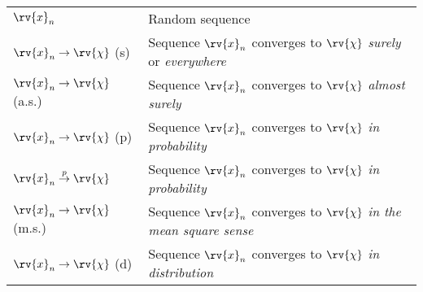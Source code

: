 \begin{table}[h]
    \centering
    \begin{tabular}{p{}p{}}
        $\rv{x}_{n}$ & Random sequence\\
        $\rv{x}_{n}\to\rv{\chi}$ \hspace{1em}(s) & Sequence $\rv{x}_{n}$ converges to $\rv{\chi}$ \emph{surely} or \emph{everywhere}\\
        $\rv{x}_{n}\to\rv{\chi}$ \hspace{1em}(a.s.) & Sequence $\rv{x}_{n}$ converges to $\rv{\chi}$ \emph{almost surely} \\
        $\rv{x}_{n}\to\rv{\chi}$ \hspace{1em}(p) & Sequence $\rv{x}_{n}$ converges to $\rv{\chi}$ \emph{in probability} \\
        $\rv{x}_{n}\overset{p}{\to}\rv{\chi}$ & Sequence $\rv{x}_{n}$ converges to $\rv{\chi}$ \emph{in probability} \\
        $\rv{x}_{n}\to\rv{\chi}$ \hspace{1em}(m.s.) & Sequence $\rv{x}_{n}$ converges to $\rv{\chi}$ \emph{in the mean square sense} \\
        $\rv{x}_{n}\to\rv{\chi}$ \hspace{1em}(d) & Sequence $\rv{x}_{n}$ converges to $\rv{\chi}$ \emph{in distribution} 
    \end{tabular}
\end{table}